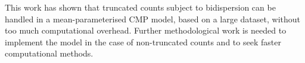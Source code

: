 \documentclass{statsoc}
\newcommand{\pmp}[1]{\textcolor{blue}{#1}}
\begin{document}
This work has shown that truncated counts subject to bidispersion can be handled in a mean-parameterised CMP model, based on a large dataset, without too much computational overhead. Further methodological work is needed to implement the model in the case of non-truncated counts and to seek faster computational methods.


\newpage
%
%


\end{document}
